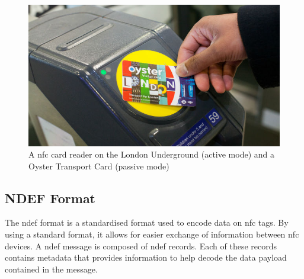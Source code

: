 \documentclass[twoside, openright,11pt,a4paper]{book}
\begin{document}
\begin{figure}[H]
\begin{center}
	\includegraphics[width=.6\textwidth]{assets/oyster_reader.jpg}
	\caption[NFC reader and Oyster Card]{A \gls{nfc} card reader on the London Underground (active mode) and a Oyster Transport Card (passive mode) \cite{img:oyster}}
\end{center}
\end{figure}

\subsection{NDEF Format}
The \gls{ndef} format is a standardised format used to encode data on \gls{nfc} tags. By using a standard format, it allows for easier exchange of information between \gls{nfc} devices. A \gls{ndef} message is composed of \gls{ndef} records. Each of these records contains metadata that provides information to help decode the data payload contained in the message.\\
\end{document}
